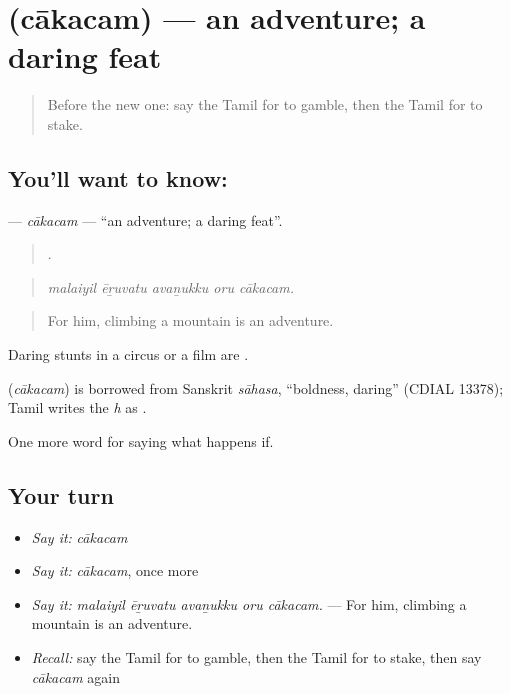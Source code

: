 \section[\texorpdfstring{\ta{சாகசம்} (cākacam)}{சாகசம் (cākacam)}]{ (cākacam) — an adventure; a daring feat}

\label{lesson:TA-C544-cakacam}



\begin{quote}
Before the new one: say the Tamil for to gamble, then the Tamil for to stake.
\end{quote}

\subsection*{You'll want to know: }
\textbf{} — \emph{cākacam} — \textquotedblleft{}an adventure; a daring feat\textquotedblright{}.

\begin{quote}
    .
\end{quote}

\begin{quote}
\emph{malaiyil ēṟuvatu avaṉukku oru cākacam.}
\end{quote}

\begin{quote}
For him, climbing a mountain is an adventure.
\end{quote}

Daring stunts in a circus or a film are .

\begin{cousinweb}
\textbf{} (\emph{cākacam}) is borrowed from Sanskrit \emph{sāhasa}, \textquotedblleft{}boldness, daring\textquotedblright{} (CDIAL 13378); Tamil writes the \emph{h} as .
\end{cousinweb}

\begin{grammarlens}[title={What you've built}]
One more word for saying what happens if.
\end{grammarlens}

\subsection*{Your turn}
\begin{itemize}
\raggedright
  \item \emph{Say it:} \emph{cākacam}
  \item \emph{Say it:} \emph{cākacam}, once more
  \item \emph{Say it:} \emph{malaiyil ēṟuvatu avaṉukku oru cākacam.} — For him, climbing a mountain is an adventure.
  \item \emph{Recall:} say the Tamil for to gamble, then the Tamil for to stake, then say \emph{cākacam} again
\end{itemize}

